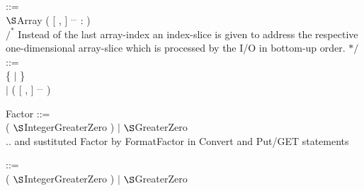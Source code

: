  ::=\\
\x {}$\S $Array ( [  , ] $^{...}$  :  )\\
\x $/^*$ Instead of the last array-index an index-slice is given to address 
the respective one-dimensional array-slice which is processed by the I/O 
in bottom-up order. $*/$\\

 ::=\\
 \{  $\mid$  \}\\
\x $\mid$  (  [ ,  ] $^{...}$ )\\
      
\begin{removed}  
Factor ::=\\
\x ( $\S $IntegerGreaterZero ) $\mid$ $\S $GreaterZero\\

.. and sustituted Factor by FormatFactor in Convert and Put/GET statements
\end{removed}  
\begin{added}  
 ::=\\
\x ( $\S $IntegerGreaterZero ) $\mid$ $\S $GreaterZero\\
\end{added}  

